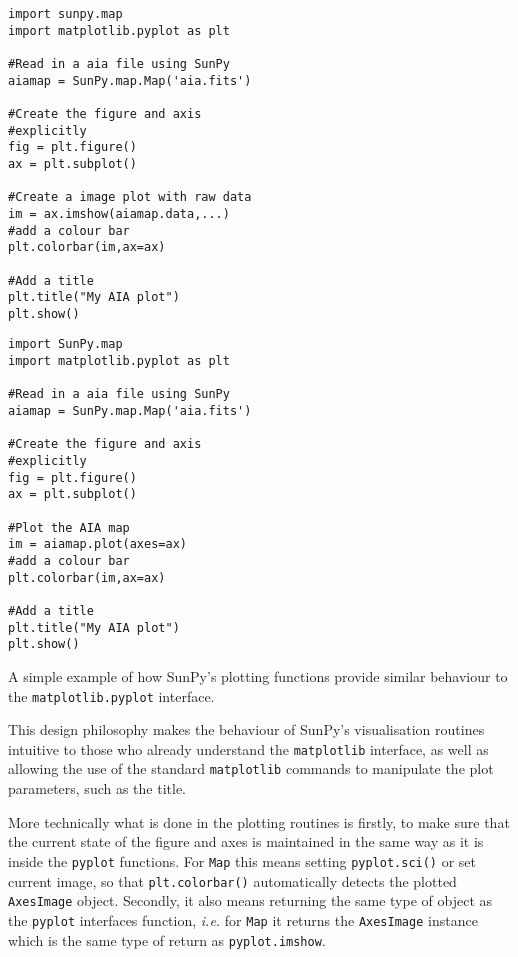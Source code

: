 \begin{listing}[H]
\begin{minipage}{0.49\columnwidth}
\begin{verbatim}
import sunpy.map
import matplotlib.pyplot as plt

#Read in a aia file using SunPy
aiamap = SunPy.map.Map('aia.fits')

#Create the figure and axis 
#explicitly
fig = plt.figure()
ax = plt.subplot()

#Create a image plot with raw data
im = ax.imshow(aiamap.data,...)
#add a colour bar
plt.colorbar(im,ax=ax)

#Add a title
plt.title("My AIA plot")
plt.show()
\end{verbatim}
\end{minipage}
\begin{minipage}{0.49\columnwidth}
\begin{verbatim}
import SunPy.map
import matplotlib.pyplot as plt

#Read in a aia file using SunPy
aiamap = SunPy.map.Map('aia.fits')

#Create the figure and axis 
#explicitly
fig = plt.figure()
ax = plt.subplot()

#Plot the AIA map
im = aiamap.plot(axes=ax)
#add a colour bar
plt.colorbar(im,ax=ax)

#Add a title
plt.title("My AIA plot")
plt.show()
\end{verbatim}
\end{minipage}
\caption{A simple example of how SunPy's plotting functions provide similar 
behaviour to the \texttt{matplotlib.pyplot} interface.}
\label{code:mpl_1}
\end{listing}

This design philosophy makes the behaviour of SunPy's visualisation 
routines intuitive to those who already understand the \texttt{matplotlib}
interface, as well as allowing the use of the standard 
\texttt{matplotlib} commands to manipulate the plot parameters, such as the title.

More technically what is done in the plotting routines is firstly, to 
make sure that the current state of the figure and axes is maintained 
in the same way as it is inside the \texttt{pyplot} functions. For 
\texttt{Map} this means setting \texttt{pyplot.sci()} or set current 
image, so that \texttt{plt.colorbar()} 
automatically detects the plotted \texttt{AxesImage} object. 
Secondly, it also means returning the same type of object as the 
\texttt{pyplot} interfaces function, \textit{i.e.} for \texttt{Map} 
it returns the \texttt{AxesImage} instance which is the same type of 
return as \texttt{pyplot.imshow}.
